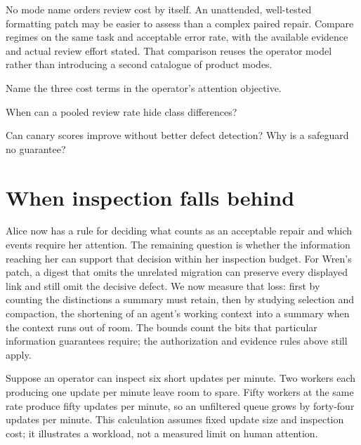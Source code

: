 \documentclass[11pt,a4paper]{article}
\theoremstyle{definition}
\theoremstyle{plain}
\begin{document}
No mode name orders review cost by itself. An unattended, well-tested formatting
patch may be easier to assess than a complex paired repair. Compare regimes on
the same task and acceptable error rate, with the available evidence and actual
review effort stated. That comparison reuses the operator model rather than
introducing a second catalogue of product modes.

\pdexercisepointer*{\ref{ex:ls-sdt-limits}}{\ref{ex:ls-freeze-probe-study}}{\pageref{ex:ls-sdt-limits}}

\begin{pdrecitation}
\item Name the three cost terms in the operator's attention objective.
\item When can a pooled review rate hide class differences?
\item Can canary scores improve without better defect detection? Why is a safeguard no guarantee?
\end{pdrecitation}



\section{When inspection falls behind}\label{sec:readpoverty}

Alice now has a rule for deciding what counts as an acceptable repair and
which events require her attention. The remaining question is whether the
information reaching her can support that decision within her inspection
budget. For Wren's patch, a digest that omits the unrelated migration can
preserve every displayed link and still omit the decisive defect. We now
measure that loss: first by counting the distinctions a summary must retain,
then by studying selection and compaction, the shortening of an agent's
working context into a summary when the context runs out of room. The bounds count the bits that
particular information guarantees require; the authorization and evidence
rules above still apply.

%
Suppose an operator can inspect six short updates per minute. Two workers each
producing one update per minute leave room to spare. Fifty workers at the same
rate produce fifty updates per minute, so an unfiltered queue grows by forty-four
updates per minute. This calculation assumes fixed update size and inspection
cost; it illustrates a workload, not a measured limit on human attention.
\end{document}
